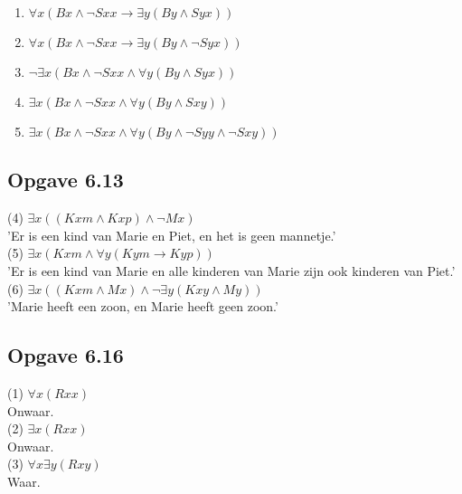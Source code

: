 \documentclass[11pt]{article}
\newcommand{\E}{\exists}
\newcommand{\A}{\forall}
\begin{document}
  \begin{enumerate}
    \item $\A x(Bx \wedge \neg Sxx \rightarrow \E y(By \wedge Syx))$
    \item $\A x(Bx \wedge \neg Sxx \rightarrow \E y(By \wedge \neg Syx))$
    \item $\neg \E x(Bx \wedge \neg Sxx \wedge \A y(By \wedge Syx))$
    \item $\E x(Bx \wedge \neg Sxx \wedge \A y(By \wedge Sxy))$
    \item $\E x(Bx \wedge \neg Sxx \wedge \A y(By \wedge \neg Syy \wedge \neg Sxy))$
  \end{enumerate}


  \subsection*{Opgave 6.13}

  (4) $\E x((Kxm \wedge Kxp) \wedge \neg Mx)$ \\

  'Er is een kind van Marie en Piet, en het is geen mannetje.' \\

  (5) $\E x(Kxm \wedge \A y(Kym \rightarrow Kyp))$ \\

  'Er is een kind van Marie
  en alle kinderen van Marie zijn ook kinderen van Piet.' \\

  (6) $\E x((Kxm \wedge Mx) \wedge \neg \E y(Kxy \wedge My))$ \\

  'Marie heeft een zoon, en Marie heeft geen zoon.' \\


  \subsection*{Opgave 6.16}

  (1) $\A x(Rxx)$ \\

  Onwaar. \\

  (2) $\E x(Rxx)$ \\

  Onwaar. \\

  (3) $\A x \E y(Rxy)$ \\

  Waar. \\
\end{document}
